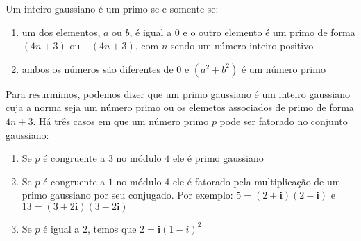 \begin{Df}

Um inteiro gaussiano \'e um primo se e somente se:

\begin{enumerate}
	
	\item um dos elementos, $a$ ou $b$, \'e igual a $0$ e o outro elemento \'e um primo de forma $(4n + 3)$ ou $-(4n + 3)$, com $n$ sendo um n\'umero inteiro positivo
	
	\item ambos os n\'umeros s\~ao diferentes de $0$ e $(a^2 + b^2)$ \'e um n\'umero primo
	
\end{enumerate}

\end{Df}

Para resurmimos, podemos dizer que um primo gaussiano \'e um inteiro gaussiano cuja a norma seja um n\'umero primo ou os elemetos associados de primo de forma $4n + 3$. H\'a tr\^es casos em que um n\'umero primo $p$ pode ser fatorado no conjunto gaussiano:

\begin{enumerate}
	
	\item Se $p$ \'e congruente a $3$ no m\'odulo $4$ ele \'e primo gaussiano
	
	\item Se $p$ \'e congruente a $1$ no m\'odulo $4$ ele \'e fatorado pela multiplica\c{c}\~ao de um primo gaussiano por seu conjugado. Por exemplo: $5 = (2 + \textbf{i})(2 - \textbf{i})$ e $13 = (3+2\textbf{i})(3-2\textbf{i})$
	
	\item Se $p$ \'e igual a $2$, temos que $2 = \textbf{i}{(1-i)}^2$ 
	
\end{enumerate}